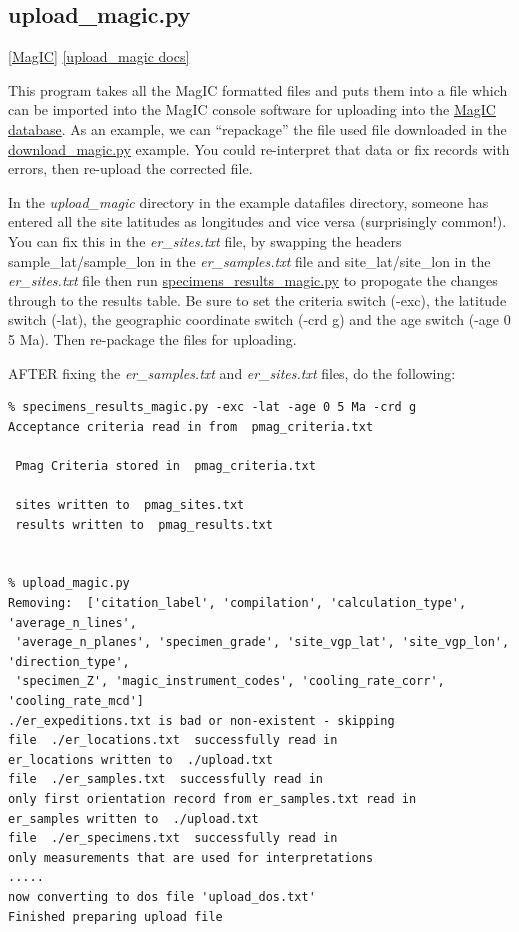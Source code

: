 \documentclass[11pt]{book}
\begin{document}
{{
\subsection{upload\_magic.py}
\href{#MagIC}{[MagIC]}
\href{http://earthref.org/PmagPy/pmagpydocs/upload_magic-module.html}{[upload\_magic docs]}

This program takes all the MagIC formatted files and puts them into a file which can be imported into the MagIC console software for uploading into the \href{http://earthref.org/MagIC}{MagIC database}. 
As an example, we can ``repackage'' the file used file downloaded in the \href{#download_magic.py}{download\_magic.py} example.  You could re-interpret that data or fix records with errors, then re-upload the corrected file.  

In the {\it upload\_magic} directory in the example datafiles directory, someone has entered all the site latitudes as longitudes and vice versa (surprisingly common!).    You can fix this in the {\it er\_sites.txt} file, by swapping the headers sample\_lat/sample\_lon in the {\it er\_samples.txt} file and site\_lat/site\_lon in the {\it er\_sites.txt} file then run \href{#specimens\_results\_magic.py}{specimens\_results\_magic.py} to propogate the changes through to the results table.  Be sure to set the criteria switch (-exc), the latitude switch (-lat), the geographic coordinate switch (-crd g) and the age switch (-age 0 5 Ma).    Then re-package the files for uploading. 

AFTER fixing the {\it er\_samples.txt} and {\it er\_sites.txt} files, do the following:



\begin{verbatim}
% specimens_results_magic.py -exc -lat -age 0 5 Ma -crd g
Acceptance criteria read in from  pmag_criteria.txt

 Pmag Criteria stored in  pmag_criteria.txt 

 sites written to  pmag_sites.txt
 results written to  pmag_results.txt


% upload_magic.py 
Removing:  ['citation_label', 'compilation', 'calculation_type', 'average_n_lines',
 'average_n_planes', 'specimen_grade', 'site_vgp_lat', 'site_vgp_lon', 'direction_type', 
 'specimen_Z', 'magic_instrument_codes', 'cooling_rate_corr', 'cooling_rate_mcd']
./er_expeditions.txt is bad or non-existent - skipping 
file  ./er_locations.txt  successfully read in
er_locations written to  ./upload.txt
file  ./er_samples.txt  successfully read in
only first orientation record from er_samples.txt read in 
er_samples written to  ./upload.txt
file  ./er_specimens.txt  successfully read in
only measurements that are used for interpretations 
.....
now converting to dos file 'upload_dos.txt'
Finished preparing upload file 
\end{verbatim}

}}
\end{document}
